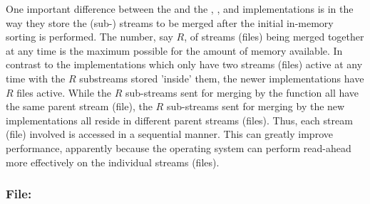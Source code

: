 One important difference between the 
and the , , and
 implementations is in the way they
store the (sub-) streams to be merged after the initial
in-memory sorting is performed. The number, say $R$, of
streams (files) being merged together at any time is the maximum
possible for the amount of memory available. In contrast to
the  implementations which only have
two streams (files) active at any time with the $R$ substreams
stored 'inside' them, the newer implementations have $R$
files active. While the $R$ sub-streams sent
for merging by the  function all have
the same parent stream (file), the $R$ sub-streams sent for merging
by the new implementations all reside in different parent
streams (files). Thus, each stream (file) involved is accessed in a
sequential manner. This can greatly improve performance,
apparently because the operating system can perform
read-ahead more effectively on the individual
streams (files).




\subsubsection{File: }

